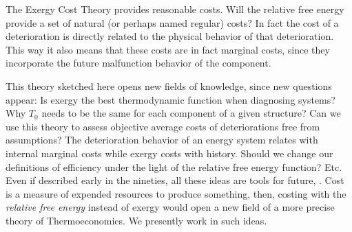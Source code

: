 \documentclass[energies,article,submit,moreauthors,pdftex]{Definitions/mdpi}
\begin{document}
The Exergy Cost Theory provides reasonable costs. Will the relative free energy provide a set of natural (or perhaps named regular) costs? In fact the cost of a deterioration is directly related to the physical behavior of that deterioration. This way it also means that these costs are in fact marginal costs, since they incorporate the future malfunction behavior of the component.

This theory sketched here opens new fields of knowledge, since new questions appear:  Is exergy the best thermodynamic function when diagnosing systems? Why $T_0$ needs to be the same for each component of a given structure? Can we use this theory to assess objective average costs of deteriorations free from assumptions? The deterioration behavior of an energy system relates with internal marginal costs while exergy costs with history. Should we change our definitions of efficiency under the light of the relative free energy function? Etc. Even if described early in the nineties, all these ideas are tools for future, \cite{Naredo2000}. Cost is a measure of expended resources to produce something, then, costing with the \emph{relative free energy} instead of exergy would open a new field of a more precise theory of Thermoeconomics. We presently work in such ideas.
\vspace{12pt}

\end{document}
